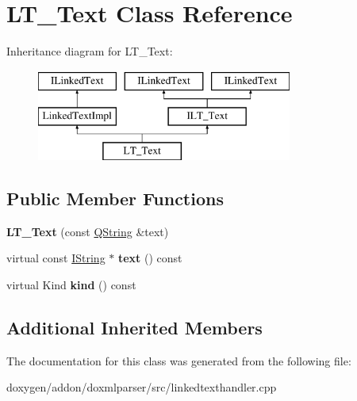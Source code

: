 \hypertarget{class_l_t___text}{}\section{L\+T\+\_\+\+Text Class Reference}
\label{class_l_t___text}
Inheritance diagram for L\+T\+\_\+\+Text\+:\begin{figure}[H]
\begin{center}
\leavevmode
\includegraphics[height=3.000000cm]{class_l_t___text}
\end{center}
\end{figure}
\subsection*{Public Member Functions}
\begin{DoxyCompactItemize}
\item 
\mbox{\label{class_l_t___text_a4c83c3a51109e43c1a31ba33c252a459}} 
{\bfseries L\+T\+\_\+\+Text} (const \mbox{\hyperlink{class_q_string}{Q\+String}} \&text)
\item 
\mbox{\label{class_l_t___text_ae99e1f86fb6541c05b210329eb6a0561}} 
virtual const \mbox{\hyperlink{class_i_string}{I\+String}} $\ast$ {\bfseries text} () const
\item 
\mbox{\label{class_l_t___text_a81497367b153e683885d66b86f85aa07}} 
virtual Kind {\bfseries kind} () const
\end{DoxyCompactItemize}
\subsection*{Additional Inherited Members}


The documentation for this class was generated from the following file\+:\begin{DoxyCompactItemize}
\item 
doxygen/addon/doxmlparser/src/linkedtexthandler.\+cpp\end{DoxyCompactItemize}
